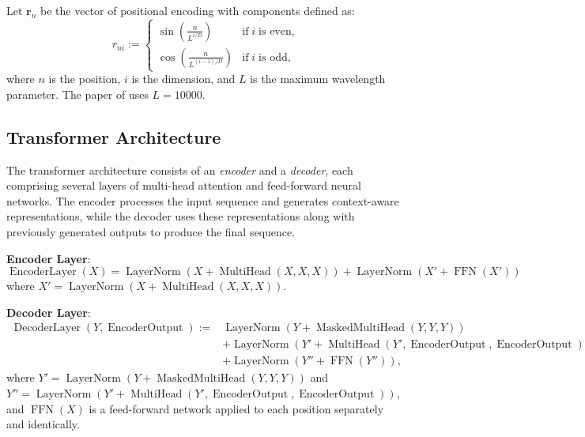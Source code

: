 \begin{defn}
    Let $\mathbf{r}_n$ be the vector of positional encoding with components defined as:
    \begin{equation}
        r_{ni}:=\begin{cases}
            \sin\left(\displaystyle\frac{n}{L^{i/D}}\right)&\text{if}\;i\;\text{is even,}\\
            \cos\left(\displaystyle\frac{n}{L^{(i-1)/D}}\right)&\text{if}\;i\;\text{is odd},
        \end{cases}
    \end{equation}
    where $n$ is the position, $i$ is the dimension, and $L$ is the maximum wavelength parameter. The paper of  uses $L=10000$.
\end{defn}

\subsection{Transformer Architecture}
The transformer architecture consists of an \textit{encoder} and a \textit{decoder}, each comprising several layers of multi-head attention and feed-forward neural networks. The encoder processes the input sequence and generates context-aware representations, while the decoder uses these representations along with previously generated outputs to produce the final sequence.

\textbf{Encoder Layer}:
\begin{equation}
    \operatorname{EncoderLayer}(X)=\operatorname{LayerNorm}(X+\operatorname{MultiHead}(X,X,X))+\operatorname{LayerNorm}(X'+\operatorname{FFN}(X'))\nonumber
\end{equation}
where $X' = \operatorname{LayerNorm}(X+\operatorname{MultiHead}(X,X,X))$.

\textbf{Decoder Layer}:
\begin{align}
    \operatorname{DecoderLayer}(Y,\operatorname{EncoderOutput}):=&\operatorname{LayerNorm}(Y+\operatorname{MaskedMultiHead}(Y,Y,Y))\\
    &+ \operatorname{LayerNorm}(Y'+\operatorname{MultiHead}(Y',\operatorname{EncoderOutput},\operatorname{EncoderOutput}))\nonumber\\
    &+ \operatorname{LayerNorm}(Y''+\operatorname{FFN}(Y''))\nonumber,
\end{align}
where $Y' = \operatorname{LayerNorm}(Y+\operatorname{MaskedMultiHead}(Y,Y,Y))$ and $Y'' = \operatorname{LayerNorm}(Y'+\operatorname{MultiHead}(Y',\operatorname{EncoderOutput},\operatorname{EncoderOutput}))$, and $\operatorname{FFN}(X)$ is a feed-forward network applied to each position separately and identically.


